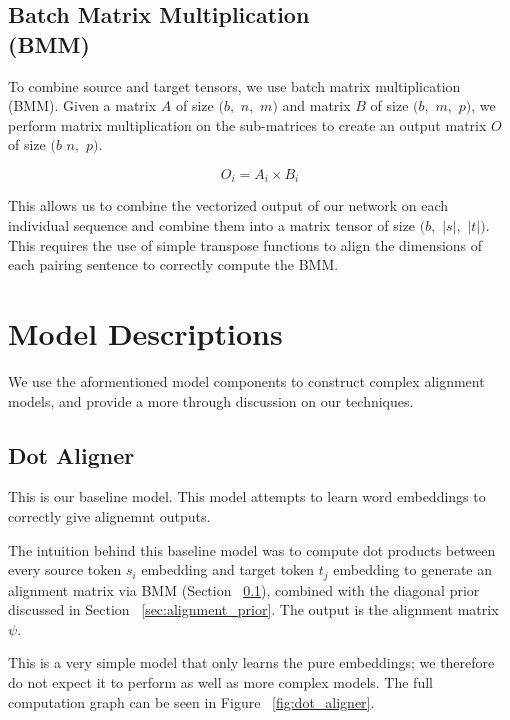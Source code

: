 \documentclass[twoside,twocolumn]{article}
\begin{document}
\subsection{Batch Matrix Multiplication\\(BMM)}
\label{sec:bmm}
To combine source and target tensors, we use batch matrix multiplication (BMM).
Given a matrix $A$ of size $(b,$ $n,$ $m)$ and matrix $B$ of size
$(b,$ $m,$ $p)$, we perform matrix multiplication on the sub-matrices to
create an output matrix $O$ of size $(b$ $n,$ $p)$.

\begin{equation}
  O_i = A_i \times B_i
\end{equation}

This allows us to combine the vectorized output of our network on each
individual sequence and combine them into a matrix tensor of size
$(b,$ $|s|,$ $|t|)$. This requires the use of simple transpose functions to
align the dimensions of each pairing sentence to correctly compute the BMM.

\section{Model Descriptions}
We use the aformentioned model components to construct complex alignment
models, and provide a more through discussion on our techniques.

\subsection{Dot Aligner}
This is our baseline model. This model attempts to learn word embeddings
to correctly give alignemnt outputs.

The intuition behind this baseline model was to compute dot products
between every source token $s_i$ embedding and target token $t_j$ embedding
to generate an alignment matrix via BMM (Section ~\ref{sec:bmm}), combined
with the diagonal prior discussed in Section ~\ref{sec:alignment_prior}.
The output is the alignment matrix $\psi$.

This is a very simple model that only learns the pure embeddings; we
therefore do not expect it to perform as well as more complex models.
The full computation graph can be seen in Figure ~\ref{fig:dot_aligner}.
\end{document}
